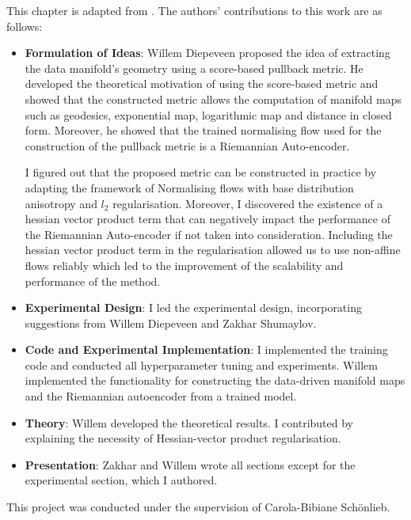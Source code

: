 This chapter is adapted from \cite{diepeveen2024score}. The authors' contributions to this work are as follows:

\begin{itemize}
\item \textbf{Formulation of Ideas}: Willem Diepeveen proposed the idea of extracting the data manifold's geometry using a score-based pullback metric. He developed the theoretical motivation of using the score-based metric and showed that the constructed metric allows the computation of manifold maps such as geodesics, exponential map, logarithmic map and distance in closed form. Moreover, he showed that the trained normalising flow used for the construction of the pullback metric is a Riemannian Auto-encoder.

I figured out that the proposed metric can be constructed in practice by adapting the framework of Normalising flows with base distribution anisotropy and $l_2$ regularisation. Moreover, I discovered the existence of a hessian vector product term that can negatively impact the performance of the Riemannian Auto-encoder if not taken into consideration. 
Including the hessian vector product term in the regularisation allowed us to use non-affine flows reliably which led to the improvement of the scalability and performance of the method.

\item \textbf{Experimental Design}: I led the experimental design, incorporating suggestions from Willem Diepeveen and Zakhar Shumaylov.
\item \textbf{Code and Experimental Implementation}: I implemented the training code and conducted all hyperparameter tuning and experiments. Willem implemented the functionality for constructing the data-driven manifold maps and the Riemannian autoencoder from a trained model.
\item \textbf{Theory}: Willem developed the theoretical results. I contributed by explaining the necessity of Hessian-vector product regularisation.
\item \textbf{Presentation}: Zakhar and Willem wrote all sections except for the experimental section, which I authored.
\end{itemize}

This project was conducted under the supervision of Carola-Bibiane Sch\"onlieb.